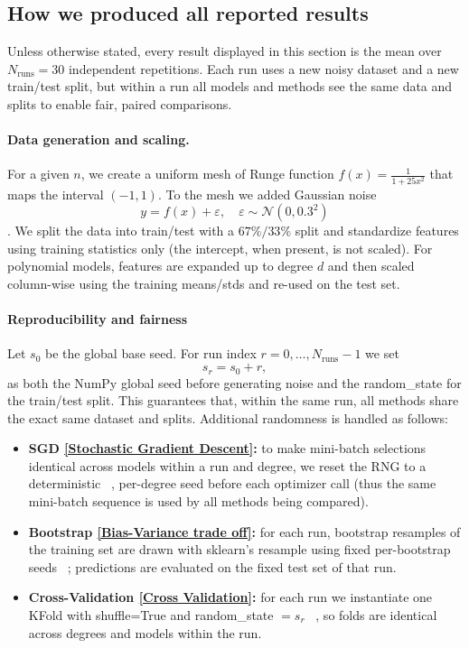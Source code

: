 \documentclass[
    article
 reprint,            %
 amsmath,amssymb,
 aps,
]{revtex4-2}
\begin{document}
\subsection*{How we produced all reported results}
\label{sec:results_setup}
Unless otherwise stated, every result displayed in this section is the mean over $N_{\text{runs}}=30$ independent repetitions. Each run uses a new noisy dataset and a new train/test split, but within a run all models and methods see the same data and splits to enable fair, paired comparisons.

\paragraph*{Data generation and scaling.}
For a given $n$, we create a uniform mesh of Runge function $f(x)=\tfrac{1}{1+25x^2}$ that maps the interval $(-1,1)$. To the mesh we added Gaussian noise \[ y = f(x) + \varepsilon, \quad \varepsilon \sim \mathcal{N}(0, 0.3^2) \]. We split the data into train/test with a $67\%/33\%$ split and standardize features using training statistics only (the intercept, when present, is not scaled). For polynomial models, features are expanded up to degree $d$ and then scaled column-wise using the training means/stds and re-used on the test set.

\paragraph*{Reproducibility and fairness}
Let $s_0$ be the global base seed. For run index $r=0,\dots,N_{\text{runs}}-1$ we set
\[
s_r = s_0 + r,
\]
as both the NumPy global seed before generating noise and the random\_state for the train/test split. This guarantees that, within the same run, all methods share the exact same dataset and splits. Additional randomness is handled as follows:
\begin{itemize}
    \item \textbf{SGD \ref{Stochastic Gradient Descent}:} to make mini-batch selections identical across models within a run and degree, we reset the RNG to a deterministic ~\cite{numpy-seed}, per-degree seed before each optimizer call (thus the same mini-batch sequence is used by all methods being compared).
    \item \textbf{Bootstrap \ref{Bias-Variance trade off}:} for each run, bootstrap resamples of the training set are drawn with sklearn's resample using fixed per-bootstrap seeds ~\cite{scikit-learn-resample}; predictions are evaluated on the fixed test set of that run.
    \item \textbf{Cross-Validation \ref{Cross Validation}:} for each run we instantiate one KFold with shuffle=True and random\_state $=s_r$ ~\cite{scikit-learn-crossvalidation}, so folds are identical across degrees and models within the run.
\end{itemize}
\end{document}
